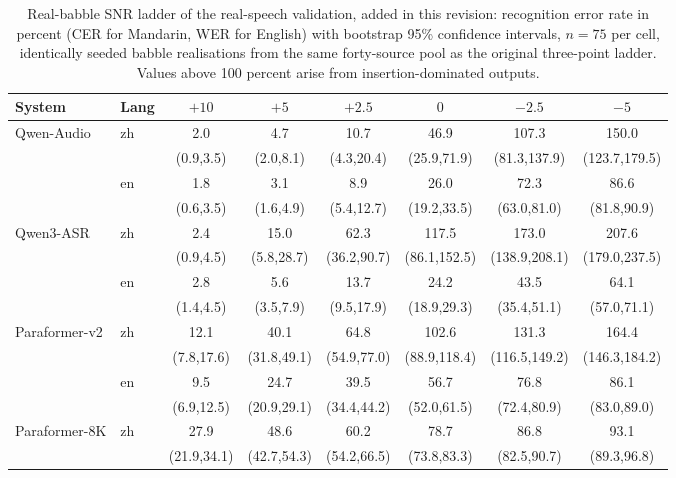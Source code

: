 \begin{table}[t]
\centering
\caption{Real-babble SNR ladder of the real-speech validation, added in
this revision: recognition error rate in percent (CER for Mandarin, WER
for English) with bootstrap 95\% confidence intervals, $n = 75$ per cell,
identically seeded babble realisations from the same forty-source pool as
the original three-point ladder. Values above 100 percent arise from
insertion-dominated outputs.}
\label{tab:realladder}
\footnotesize
\setlength{\tabcolsep}{3.0pt}
\begin{tabular}{llcccccc}
\toprule
System & Lang & $+10$ & $+5$ & $+2.5$ & $0$ & $-2.5$ & $-5$ \\
\midrule
Qwen-Audio & zh & 2.0 & 4.7 & 10.7 & 46.9 & 107.3 & 150.0 \\
 &  & (0.9,3.5) & (2.0,8.1) & (4.3,20.4) & (25.9,71.9) & (81.3,137.9) & (123.7,179.5) \\
 & en & 1.8 & 3.1 & 8.9 & 26.0 & 72.3 & 86.6 \\
 &  & (0.6,3.5) & (1.6,4.9) & (5.4,12.7) & (19.2,33.5) & (63.0,81.0) & (81.8,90.9) \\
Qwen3-ASR & zh & 2.4 & 15.0 & 62.3 & 117.5 & 173.0 & 207.6 \\
 &  & (0.9,4.5) & (5.8,28.7) & (36.2,90.7) & (86.1,152.5) & (138.9,208.1) & (179.0,237.5) \\
 & en & 2.8 & 5.6 & 13.7 & 24.2 & 43.5 & 64.1 \\
 &  & (1.4,4.5) & (3.5,7.9) & (9.5,17.9) & (18.9,29.3) & (35.4,51.1) & (57.0,71.1) \\
Paraformer-v2 & zh & 12.1 & 40.1 & 64.8 & 102.6 & 131.3 & 164.4 \\
 &  & (7.8,17.6) & (31.8,49.1) & (54.9,77.0) & (88.9,118.4) & (116.5,149.2) & (146.3,184.2) \\
 & en & 9.5 & 24.7 & 39.5 & 56.7 & 76.8 & 86.1 \\
 &  & (6.9,12.5) & (20.9,29.1) & (34.4,44.2) & (52.0,61.5) & (72.4,80.9) & (83.0,89.0) \\
Paraformer-8K & zh & 27.9 & 48.6 & 60.2 & 78.7 & 86.8 & 93.1 \\
 &  & (21.9,34.1) & (42.7,54.3) & (54.2,66.5) & (73.8,83.3) & (82.5,90.7) & (89.3,96.8) \\
\bottomrule
\end{tabular}
\end{table}

